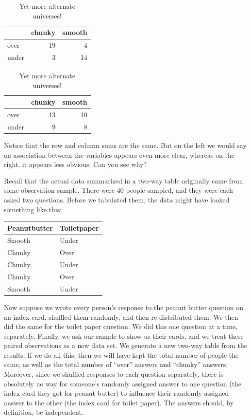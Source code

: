 \documentclass[openany]{book}
\begin{document}
\begin{table}[!h]
\caption{\label{tab:unnamed-chunk-8}Yet more alternate universes!}

\centering
\begin{tabular}[t]{lrr}
\toprule
  & chunky & smooth\\
\midrule
over & 19 & 4\\
under & 3 & 14\\
\bottomrule
\end{tabular}
\centering
\begin{tabular}[t]{lrr}
\toprule
  & chunky & smooth\\
\midrule
over & 13 & 10\\
under & 9 & 8\\
\bottomrule
\end{tabular}
\end{table}

Notice that the row and column sums are the same. But on the left we would say an association between the variables appears even more clear, whereas on the right, it appears less obvious. Can you see why?

Recall that the actual data summarized in a two-way table originally came from some observation sample. There were 40 people sampled, and they were each asked two questions. Before we tabulated them, the data might have looked something like this:

\begin{table}[!h]
\centering
\begin{tabular}{l|l}
\hline
Peanutbutter & Toiletpaper\\
\hline
Smooth & Under\\
\hline
Chunky & Over\\
\hline
Chunky & Under\\
\hline
Chunky & Over\\
\hline
Smooth & Under\\
\hline
\end{tabular}
\end{table}

Now suppose we wrote every person's response to the peanut butter question on an index card, shuffled them randomly, and then re-distributed them. We then did the same for the toilet paper question. We did this one question at a time, separately. Finally, we ask our sample to show us their cards, and we treat these paired observations as a new data set. We generate a new two-way table from the results. If we do all this, then we will have kept the total number of people the same, as well as the total number of ``over'' answers and ``chunky'' answers. Moreover, since we shuffled responses to each question separately, there is absolutely no way for someone's randomly assigned answer to one question (the index card they got for peanut butter) to influence their randomly assigned answer to the other (the index card for toilet paper). The answers should, by definition, be independent.
\end{document}
